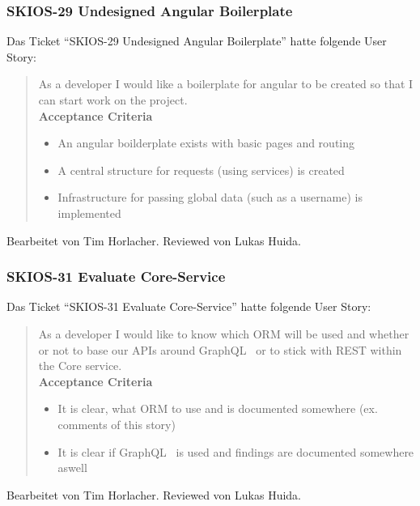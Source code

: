 \subsubsection{SKIOS-29 Undesigned Angular Boilerplate}
Das Ticket \enquote{SKIOS-29 Undesigned Angular Boilerplate} hatte folgende User Story:
\begin{quotation}
    As a developer I would like a boilerplate for angular to be created so that I can start work on the project. \\
    \textbf{Acceptance Criteria}
    \begin{itemize}
        \item An angular boilderplate exists with basic pages and routing
        \item A central structure for requests (using services) is created
        \item Infrastructure for passing global data (such as a username) is implemented
    \end{itemize}
\end{quotation}
Bearbeitet von Tim Horlacher.
Reviewed von Lukas Huida.

\subsubsection{SKIOS-31 Evaluate Core-Service}
Das Ticket \enquote{SKIOS-31 Evaluate Core-Service} hatte folgende User Story:
\begin{quotation}
    As a developer I would like to know which ORM will be used and whether or not to base our APIs around GraphQL~\parencite{web/GraphQL} or to stick with REST within the Core service. \\
    \textbf{Acceptance Criteria}
    \begin{itemize}
        \item It is clear, what ORM to use and is documented somewhere (ex. comments of this story)
        \item It is clear if GraphQL~\parencite{web/GraphQL} is used and findings are documented somewhere aswell
    \end{itemize}
\end{quotation}
Bearbeitet von Tim Horlacher.
Reviewed von Lukas Huida.

